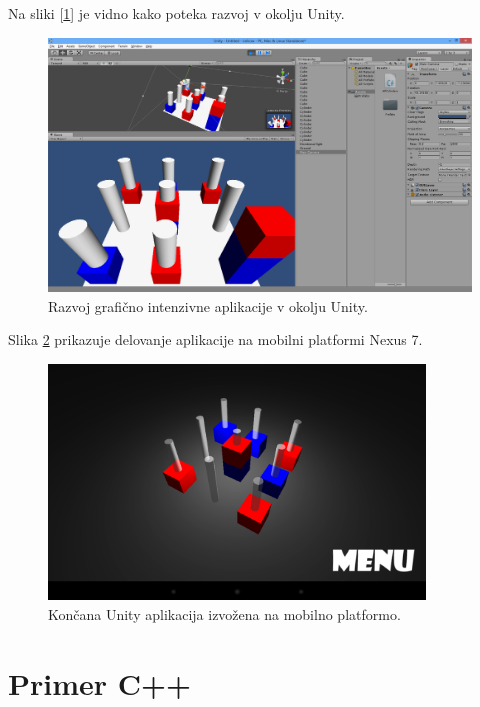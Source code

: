 Na sliki [\ref{mineditor}] je vidno kako poteka razvoj v okolju Unity.

\begin{figure}
\begin{center}
\includegraphics[width=12cm]{pic/min-editor.png}
\end{center}
\caption{Razvoj grafično intenzivne aplikacije v okolju Unity.}
\label{mineditor}
\end{figure} 

Slika \ref{minplay} prikazuje delovanje aplikacije na mobilni platformi Nexus 7.

\begin{figure}
\begin{center}
\includegraphics[width=10cm]{pic/min-play.png}
\end{center}
\caption{Končana Unity aplikacija izvožena na mobilno platformo.}
\label{minplay}
\end{figure} 

\section{Primer C++}




